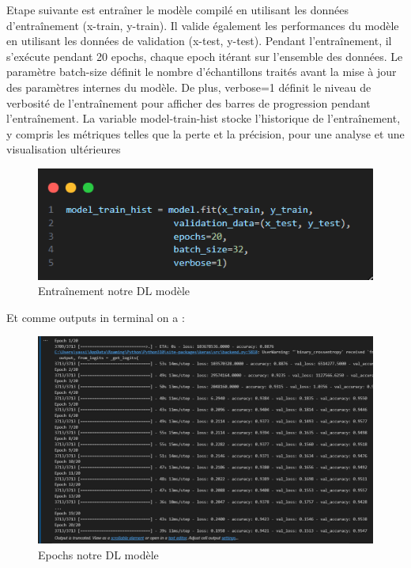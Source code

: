 \documentclass[a4paper,12pt]{report}
\begin{document}
\noindent \normalsize Etape suivante est entraîner le modèle compilé en utilisant les données d'entraînement (x-train, y-train). Il valide également les performances du modèle en utilisant les données de validation (x-test, y-test). Pendant l'entraînement, il s'exécute pendant 20 epochs, chaque epoch itérant sur l'ensemble des données. Le paramètre batch-size définit le nombre d'échantillons traités avant la mise à jour des paramètres internes du modèle. De plus, verbose=1 définit le niveau de verbosité de l'entraînement pour afficher des barres de progression pendant l'entraînement. La variable model-train-hist stocke l'historique de l'entraînement, y compris les métriques telles que la perte et la précision, pour une analyse et une visualisation ultérieures
\begin{figure}[H]
\centering
 \includegraphics[scale=0.9]{outils-images/data25.png}
\caption{Entraînement notre DL modèle}
\end{figure}
Et comme outputs in terminal on a :
\begin{figure}[H]
\centering
 \includegraphics[scale=0.7]{outils-images/data24.png}
\caption{Epochs notre DL modèle}
\end{figure}
\end{document}

